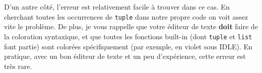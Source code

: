D'un autre côté, l'erreur est relativement facile à trouver dans ce cas.
En cherchant toutes les occurrences de \texttt{tuple} dans notre propre
code on voit assez vite le problème. De plus, je vous rappelle que votre
éditeur de texte \textbf{doit} faire de la coloration syntaxique, et que
toutes les fonctions built-in (dont \texttt{tuple} et \texttt{list} font
partie) sont colorées spécifiquement (par exemple, en violet sous IDLE).
En pratique, avec un bon éditeur de texte et un peu d'expérience, cette
erreur est très rare.


    
    
    
